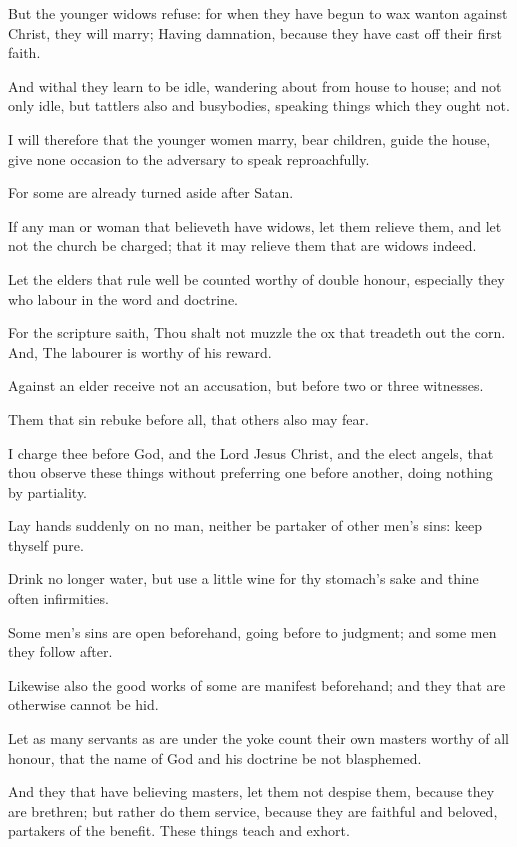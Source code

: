 \Verse But the younger widows refuse: for when they have begun to wax wanton against Christ, they will marry; \Verse Having damnation, because they have cast off their first faith.

\Verse And withal they learn to be idle, wandering about from house to house; and not only idle, but tattlers also and busybodies, speaking things which they ought not.

\Verse I will therefore that the younger women marry, bear children, guide the house, give none occasion to the adversary to speak reproachfully.

\Verse For some are already turned aside after Satan.

\Verse If any man or woman that believeth have widows, let them relieve them, and let not the church be charged; that it may relieve them that are widows indeed.

\Verse Let the elders that rule well be counted worthy of double honour, especially they who labour in the word and doctrine.

\Verse For the scripture saith, Thou shalt not muzzle the ox that treadeth out the corn. And, The labourer is worthy of his reward.

\Verse Against an elder receive not an accusation, but before two or three witnesses.

\Verse Them that sin rebuke before all, that others also may fear.

\Verse I charge thee before God, and the Lord Jesus Christ, and the elect angels, that thou observe these things without preferring one before another, doing nothing by partiality.

\Verse Lay hands suddenly on no man, neither be partaker of other men's sins: keep thyself pure.

\Verse Drink no longer water, but use a little wine for thy stomach's sake and thine often infirmities.

\Verse Some men's sins are open beforehand, going before to judgment; and some men they follow after.

\Verse Likewise also the good works of some are manifest beforehand; and they that are otherwise cannot be hid.


\Chapter
\Verse Let as many servants as are under the yoke count their own masters worthy of all honour, that the name of God and his doctrine be not blasphemed.

\Verse And they that have believing masters, let them not despise them, because they are brethren; but rather do them service, because they are faithful and beloved, partakers of the benefit. These things teach and exhort.

